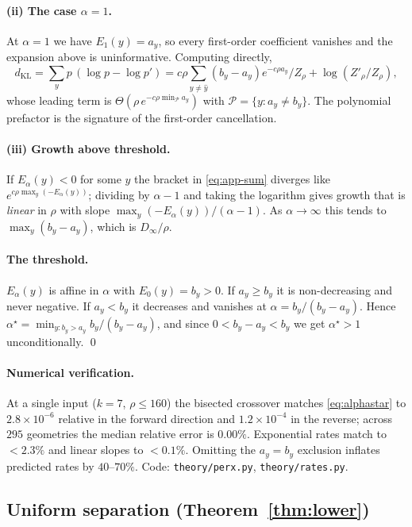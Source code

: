 \documentclass[10pt,letterpaper,twocolumn]{article}
\newcommand{\dKL}{d_{\mathrm{KL}}}
\newcommand{\Dinf}{D_{\infty}}
\theoremstyle{plain}
\theoremstyle{definition}
\theoremstyle{remark}
\begin{document}
\paragraph{(ii) The case $\alpha=1$.}
At $\alpha=1$ we have $E_{1}(y)=a_{y}$, so every first-order coefficient
vanishes and the expansion above is uninformative. Computing directly,
\[
\dKL=\sum_{y}p\,(\log p-\log p')
   = c\rho\sum_{y\neq\hat y}(b_{y}-a_{y})e^{-c\rho a_{y}}/Z_{\rho}
     +\log(Z'_{\rho}/Z_{\rho}),
\]
whose leading term is $\Theta(\rho\,e^{-c\rho\min_{\mathcal{P}}a_{y}})$ with
$\mathcal{P}=\{y: a_{y}\neq b_{y}\}$. The polynomial prefactor is the signature
of the first-order cancellation.

\paragraph{(iii) Growth above threshold.}
If $E_{\alpha}(y)<0$ for some $y$ the bracket in \eqref{eq:app-sum} diverges
like $e^{c\rho\max_{y}(-E_{\alpha}(y))}$; dividing by $\alpha-1$ and taking the
logarithm gives growth that is \emph{linear} in $\rho$ with slope
$\max_{y}(-E_{\alpha}(y))/(\alpha-1)$. As $\alpha\to\infty$ this tends to
$\max_{y}(b_{y}-a_{y})$, which is $\Dinf/\rho$.

\paragraph{The threshold.}
$E_{\alpha}(y)$ is affine in $\alpha$ with $E_{0}(y)=b_{y}>0$. If
$a_{y}\ge b_{y}$ it is non-decreasing and never negative. If $a_{y}<b_{y}$ it
decreases and vanishes at $\alpha=b_{y}/(b_{y}-a_{y})$. Hence
$\alpha^{\star}=\min_{y:b_{y}>a_{y}}b_{y}/(b_{y}-a_{y})$, and since
$0<b_{y}-a_{y}<b_{y}$ we get $\alpha^{\star}>1$ unconditionally. \qed

\paragraph{Numerical verification.}
At a single input ($k=7$, $\rho\le160$) the bisected crossover matches
\eqref{eq:alphastar} to $2.8\times10^{-6}$ relative in the forward direction and
$1.2\times10^{-4}$ in the reverse; across $295$ geometries the median relative
error is $0.00\%$. Exponential rates match to $<2.3\%$ and linear slopes to
$<0.1\%$. Omitting the $a_{y}=b_{y}$ exclusion inflates predicted rates by
$40$--$70\%$. Code: \texttt{theory/perx.py}, \texttt{theory/rates.py}.

\subsection{Uniform separation (Theorem~\ref{thm:lower})}
\end{document}
